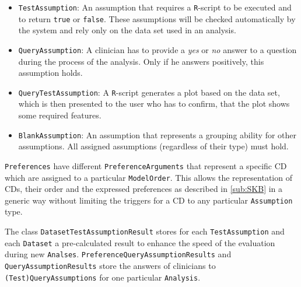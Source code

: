 \begin{itemize}

	\item \texttt{TestAssumption}: An assumption that requires a \texttt{R}-script to be executed and to return \texttt{true} or \texttt{false}. These assumptions will be checked automatically by the system and rely only on the data set used in an analysis.
	\item \texttt{QueryAssumption}: A clinician has to provide a \textit{yes} or \textit{no} answer to a question during the process of the analysis. Only if he answers positively, this assumption holds.
	\item \texttt{QueryTestAssumption}: A \texttt{R}-script generates a plot based on the data set, which is then presented to the user who has to confirm, that the plot shows some required features.
	\item \texttt{BlankAssumption}: An assumption that represents a grouping ability for other assumptions. All assigned assumptions (regardless of their type) must hold. 
\end{itemize}
\bigskip


\texttt{Preferences} have different \texttt{PreferenceArguments} that represent a specific \gls{CD} which are assigned to a particular \texttt{ModelOrder}. This allows the representation of \glspl{CD}, their order and the expressed preferences as described in \autoref{sub:SKB} in a generic way without limiting the triggers for a \gls{CD} to any particular \texttt{Assumption} type. 

The class \texttt{DatasetTestAssumptionResult} stores for each \texttt{TestAssumption} and each \texttt{Dataset} a pre-calculated result to enhance the speed of the evaluation during new \texttt{Analses}. \texttt{PreferenceQueryAssumptionResults} and \texttt{QueryAssumptionResults} store the answers of clinicians to \texttt{(Test)QueryAssumptions} for one particular \texttt{Analysis}.
